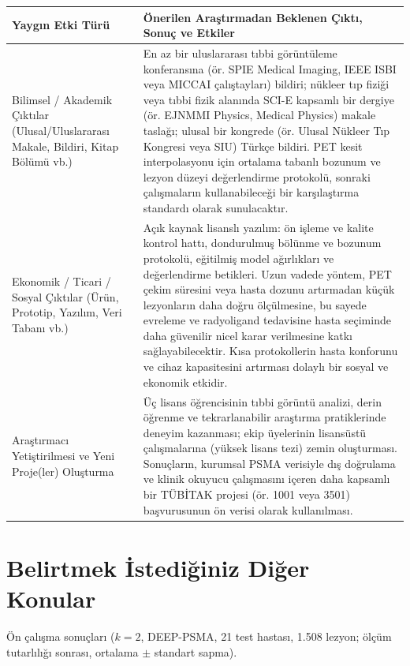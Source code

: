 \documentclass[11pt,a4paper]{article}
\begin{document}
{\small
\begin{tabularx}{\textwidth}{@{}L{4.5cm}Y@{}}
\toprule
Yaygın Etki Türü & Önerilen Araştırmadan Beklenen Çıktı, Sonuç ve Etkiler \\
\midrule
Bilimsel / Akademik Çıktılar (Ulusal/Uluslararası Makale, Bildiri, Kitap Bölümü vb.)
  & En az bir uluslararası tıbbi görüntüleme konferansına (ör. SPIE Medical Imaging, IEEE ISBI
  veya MICCAI çalıştayları) bildiri; nükleer tıp fiziği veya tıbbi fizik alanında SCI-E
  kapsamlı bir dergiye (ör. EJNMMI Physics, Medical Physics) makale taslağı; ulusal bir
  kongrede (ör. Ulusal Nükleer Tıp Kongresi veya SIU) Türkçe bildiri. PET kesit
  interpolasyonu için ortalama tabanlı bozunum ve lezyon düzeyi değerlendirme protokolü,
  sonraki çalışmaların kullanabileceği bir karşılaştırma standardı olarak sunulacaktır. \\
Ekonomik / Ticari / Sosyal Çıktılar (Ürün, Prototip, Yazılım, Veri Tabanı vb.)
  & Açık kaynak lisanslı yazılım: ön işleme ve kalite kontrol hattı, dondurulmuş bölünme ve
  bozunum protokolü, eğitilmiş model ağırlıkları ve değerlendirme betikleri. Uzun vadede
  yöntem, PET çekim süresini veya hasta dozunu artırmadan küçük lezyonların daha doğru
  ölçülmesine, bu sayede evreleme ve radyoligand tedavisine hasta seçiminde daha güvenilir
  nicel karar verilmesine katkı sağlayabilecektir. Kısa protokollerin hasta konforunu ve cihaz
  kapasitesini artırması dolaylı bir sosyal ve ekonomik etkidir. \\
Araştırmacı Yetiştirilmesi ve Yeni Proje(ler) Oluşturma
  & Üç lisans öğrencisinin tıbbi görüntü analizi, derin öğrenme ve tekrarlanabilir araştırma
  pratiklerinde deneyim kazanması; ekip üyelerinin lisansüstü çalışmalarına (yüksek lisans
  tezi) zemin oluşturması. Sonuçların, kurumsal PSMA verisiyle dış doğrulama ve klinik okuyucu
  çalışmasını içeren daha kapsamlı bir TÜBİTAK projesi (ör. 1001 veya 3501) başvurusunun ön
  verisi olarak kullanılması. \\
\bottomrule
\end{tabularx}
}

\section{Belirtmek İstediğiniz Diğer Konular}\label{sec:diger}

Ön çalışma sonuçları ($k = 2$, DEEP-PSMA, 21 test hastası, 1.508 lezyon; ölçüm tutarlılığı
sonrası, ortalama $\pm$ standart sapma).
\end{document}
